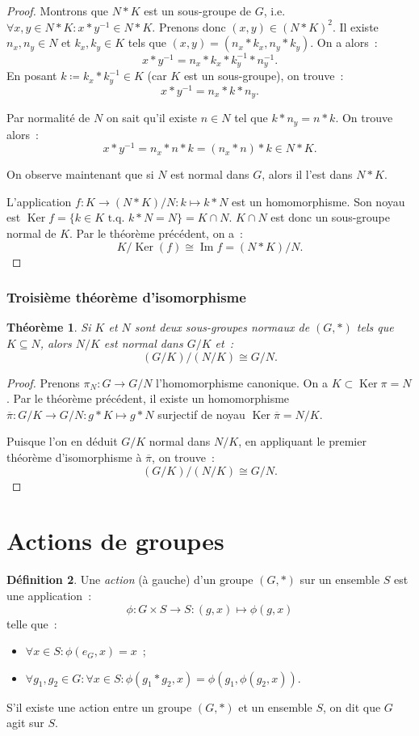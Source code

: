 \documentclass{article}
\newtheorem{thm}{Théorème}[section]
\theoremstyle{definition}
\newtheorem{déf}[thm]{Définition}
\theoremstyle{remark}
\DeclareMathOperator{\Imf}{Im}
\DeclareMathOperator{\Ker}{Ker}
\newcommand{\tq}{\text{ t.q. }}
\newcommand{\simeqq}{\cong}
\begin{document}
			\begin{proof} Montrons que $N*K$ est un sous-groupe de $G$, i.e. $\forall x, y \in N*K : x*y^{-1} \in N*K$. Prenons donc $(x, y) \in (N*K)^2$.
			Il existe $n_x, n_y \in N$ et $k_x, k_y \in K$ tels que $(x, y) = (n_x*k_x, n_y*k_y)$. On a alors~:
			\[x*y^{-1} = n_x*k_x*k_y^{-1}*n_y^{-1}.\]
			En posant $k \coloneqq k_x*k_y^{-1} \in K$ (car $K$ est un sous-groupe), on trouve~:
			\[x*y^{-1} = n_x*k*n_y.\]

			Par normalité de $N$ on sait qu'il existe $n \in N$ tel que $k*n_y = n*k$. On trouve alors~:
			\[x*y^{-1} = n_x*n*k = (n_x*n)*k \in N*K.\]

			On observe maintenant que si $N$ est normal dans $G$, alors il l'est dans $N*K$.

			L'application $f : K \to (N*K)/N : k \mapsto k*N$ est un homomorphisme. Son noyau est $\Ker f = \{k \in K \tq k*N = N\} = K \cap N$.
			$K \cap N$ est donc un sous-groupe normal de $K$. Par le théorème précédent, on a~:
			\[K/\Ker(f) \simeqq \Imf f = (N*K)/N.\]
			\end{proof}

		\subsubsection{Troisième théorème d'isomorphisme}
			\begin{thm} Si $K$ et $N$ sont deux sous-groupes normaux de $(G, *)$ tels que $K \subseteq N$, alors $N/K$ est normal dans $G/K$ et~:
			\[\left(G/K\right)/\left(N/K\right) \simeqq G/N.\]
			\end{thm}

			\begin{proof} Prenons $\pi_N : G \to G/N$ l'homomorphisme canonique. On a $K \subset \Ker \pi = N$. Par le théorème précédent, il existe un
			homomorphisme $\overline \pi : G/K \to G/N : g*K \mapsto g*N$ surjectif de noyau $\Ker \overline \pi = N/K$.

			Puisque l'on en déduit $G/K$ normal dans $N/K$, en appliquant le premier théorème d'isomorphisme à $\overline \pi$, on trouve~:
			\[\left(G/K\right)/\left(N/K\right) \simeqq G/N.\]
			\end{proof}

\section{Actions de groupes}
	\begin{déf} Une \textit{action} (à gauche) d'un groupe $(G, *)$ sur un ensemble $S$ est une application~:
	\[\phi : G \times S \to S : (g, x) \mapsto \phi(g, x)\]
	telle que~:
	\begin{itemize}
		\item $\forall x \in S : \phi(e_G, x) = x$~;
		\item $\forall g_1, g_2 \in G : \forall x \in S : \phi(g_1 * g_2, x) = \phi\left(g_1, \phi(g_2, x)\right)$.
	\end{itemize}

	S'il existe une action entre un groupe $(G, *)$ et un ensemble $S$, on dit que $G$ agit sur $S$.
	\end{déf}
\end{document}
